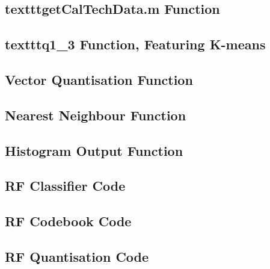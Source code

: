 \documentclass[a4paper, 10pt, conference]{ieeeconf}
\begin{document}
\subsection*{texttt{getCalTechData.m} Function}

\newpage

\subsection*{texttt{q1\_3} Function, Featuring K-means}

\newpage

\subsection*{Vector Quantisation Function}


\subsection*{Nearest Neighbour Function}

\newpage

\subsection*{Histogram Output Function}


\subsection*{RF Classifier Code}

\newpage

\subsection*{RF Codebook Code}

\newpage

\subsection*{RF Quantisation Code}

\newpage
\end{document}
